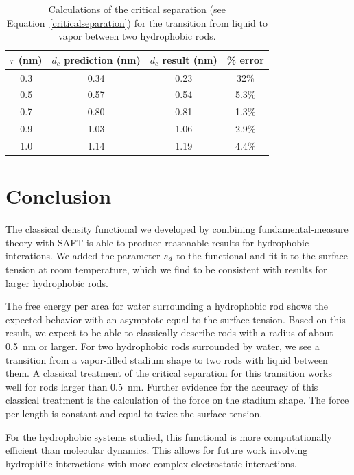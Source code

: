 \documentclass[letterpaper,twocolumn,amsmath,amssymb,prb]{revtex4-1}
\begin{document}
\begin{table}
\begin{tabular} {|c|c|c|c|}
\hline
$r$ (nm) & $d_c$ prediction (nm) & $d_c$ result (nm) & \% error \\
\hline
0.3 & 0.34 & 0.23 & 32\% \\
\hline
0.5 & 0.57 & 0.54 & 5.3\% \\
\hline
0.7 & 0.80 & 0.81 & 1.3\% \\
\hline
0.9 & 1.03 & 1.06 & 2.9\% \\
\hline
1.0 & 1.14 & 1.19 & 4.4\% \\
\hline
\end{tabular}
\caption{Calculations of the critical separation (see Equation~\ref{criticalseparation})
for the transition
from liquid to vapor between two hydrophobic rods.}
\label{criticalseparationtable}
\end{table} 


\section{Conclusion}

The classical density functional we developed by combining fundamental-measure 
theory with SAFT is able to produce reasonable results for hydrophobic interations.
We added the parameter $s_d$ to the functional and fit it to the surface tension
at room temperature, which we find to be consistent with results for larger hydrophobic
rods. 

The free energy per area for water surrounding a hydrophobic rod shows the
expected behavior with an asymptote equal to the surface tension.
Based on this result, we expect to be
able to classically describe rods with a radius of about 0.5~nm or larger. 
For two hydrophobic rods surrounded by water, we see a transition from a vapor-filled
stadium shape to two rods with liquid between them. A
classical treatment of the critical separation for this transition
works well for rods larger than 0.5~nm. Further evidence for the
accuracy of this classical treatment is the calculation of the force on the
stadium shape. The force per length is constant and equal to twice the surface tension.

For the hydrophobic systems studied, this functional is more computationally 
efficient than molecular dynamics. This allows for future work
involving hydrophilic interactions with more complex electrostatic interactions.


\end{document}

